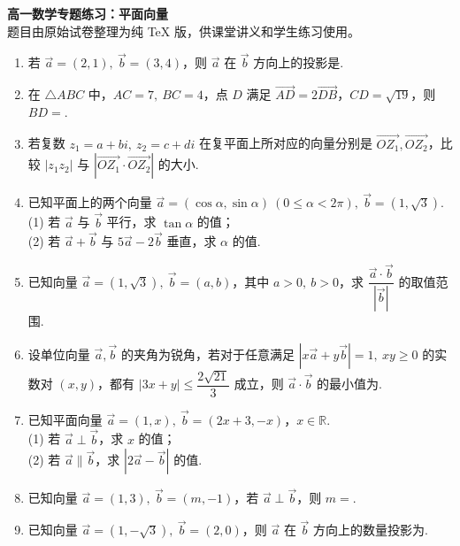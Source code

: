 \documentclass[UTF8,11pt]{ctexart}
\newcommand{\blank}{\underline{\hspace{2.8cm}}}
\begin{document}
\begin{center}
{\LARGE \bfseries 高一数学专题练习：平面向量}\\[0.4em]
{\small 题目由原始试卷整理为纯 \TeX{} 版，供课堂讲义和学生练习使用。}
\end{center}
\vspace{0.5em}
\begin{enumerate}
\item 若 $\vec a=(2,1),\ \vec b=(3,4)$，则 $\vec a$ 在 $\vec b$ 方向上的投影是\blank.

\item 在 $\triangle ABC$ 中，$AC=7,\ BC=4$，点 $D$ 满足 $\overrightarrow{AD}=2\overrightarrow{DB}$，$CD=\sqrt{19}$，则 $BD=$\blank.

\item 若复数 $z_1=a+bi,\ z_2=c+di$ 在复平面上所对应的向量分别是 $\overrightarrow{OZ_1},\overrightarrow{OZ_2}$，比较 $|z_1z_2|$ 与 $\left|\overrightarrow{OZ_1}\cdot\overrightarrow{OZ_2}\right|$ 的大小.

\item 已知平面上的两个向量 $\vec a=(\cos\alpha,\sin\alpha)\ (0\le\alpha<2\pi),\ \vec b=(1,\sqrt3)$.\\
(1) 若 $\vec a$ 与 $\vec b$ 平行，求 $\tan\alpha$ 的值；\\
(2) 若 $\vec a+\vec b$ 与 $5\vec a-2\vec b$ 垂直，求 $\alpha$ 的值.

\item 已知向量 $\vec a=(1,\sqrt3),\ \vec b=(a,b)$，其中 $a>0,\ b>0$，求 $\dfrac{\vec a\cdot\vec b}{|\vec b|}$ 的取值范围.

\item 设单位向量 $\vec a,\vec b$ 的夹角为锐角，若对于任意满足 $|x\vec a+y\vec b|=1,\ xy\ge0$ 的实数对 $(x,y)$，都有 $|3x+y|\le\dfrac{2\sqrt{21}}3$ 成立，则 $\vec a\cdot\vec b$ 的最小值为\blank.

\item 已知平面向量 $\vec a=(1,x),\ \vec b=(2x+3,-x)$，$x\in\mathbb R$.\\
(1) 若 $\vec a\perp \vec b$，求 $x$ 的值；\\
(2) 若 $\vec a\parallel\vec b$，求 $|2\vec a-\vec b|$ 的值.

\item 已知向量 $\vec a=(1,3),\ \vec b=(m,-1)$，若 $\vec a\perp\vec b$，则 $m=$\blank.

\item 已知向量 $\vec a=(1,-\sqrt3),\ \vec b=(2,0)$，则 $\vec a$ 在 $\vec b$ 方向上的数量投影为\blank.


\end{enumerate}
\end{document}
